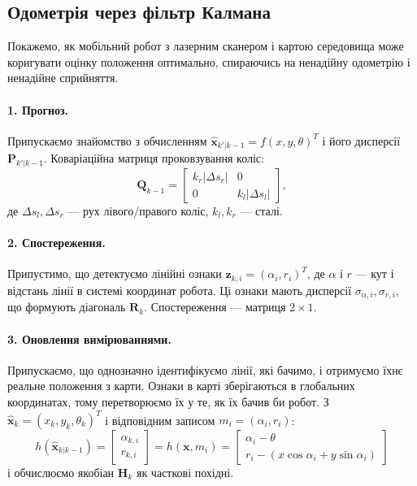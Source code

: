 \subsection{Одометрія через фільтр Калмана}
Покажемо, як мобільний робот з лазерним сканером і картою середовища може коригувати оцінку положення оптимально, спираючись на ненадійну одометрію і ненадійне сприйняття.

\paragraph{1. Прогноз.}
Припускаємо знайомство з обчисленням $\hat{\boldsymbol{x}}_{k'|k-1}=f(x,y,\theta)^T$ і його дисперсії $\boldsymbol{P}_{k'|k-1}$. Коваріаційна матриця проковзування коліс:
\begin{equation}
\boldsymbol{Q}_{k-1}=\left[\begin{array}{cc}k_r|\Delta s_r| & 0\\ 0 & k_l|\Delta s_l|\end{array}\right],
\end{equation}
де $\Delta s_l, \Delta s_r$ — рух лівого/правого коліс, $k_l, k_r$ — сталі.

\paragraph{2. Спостереження.}
Припустимо, що детектуємо лінійні ознаки $\boldsymbol{z}_{k,i}=(\alpha_i,r_i)^T$, де $\alpha$ і $r$ — кут і відстань лінії в системі координат робота. Ці ознаки мають дисперсії $\sigma_{\alpha,i}, \sigma_{r,i}$, що формують діагональ $\boldsymbol{R}_{k}$. Спостереження — матриця $2\times 1$.

\paragraph{3. Оновлення вимірюваннями.}
Припускаємо, що однозначно ідентифікуємо лінії, які бачимо, і отримуємо їхнє реальне положення з карти. Ознаки в карті зберігаються в глобальних координатах, тому перетворюємо їх у те, як їх бачив би робот. З $\hat{\boldsymbol{x}}_{k}=(x_{k},y_{k},\theta_k)^T$ і відповідним записом $m_i=(\alpha_i,r_i)$:
\begin{equation}
h(\hat{\boldsymbol{x}}_{k|k-1})=\left[\begin{array}{c}\alpha_{k,i}\\r_{k,i}\end{array}\right] = h(\boldsymbol{x},m_i) = \left[\begin{array}{c}\alpha_i-\theta\\r_i-(x\cos\alpha_i+y\sin\alpha_i)\end{array}\right]
\end{equation}
і обчислюємо якобіан $\boldsymbol{H}_{k}$ як часткові похідні.

